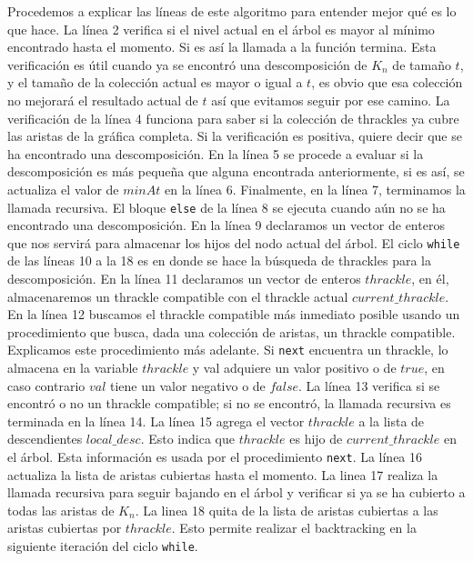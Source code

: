   Procedemos a explicar las líneas de este algoritmo para entender mejor qué es lo que hace. La línea 2
  verifica si el nivel actual en el árbol es mayor al mínimo encontrado hasta el momento. Si es así la
  llamada a la función termina. Esta verificación es útil cuando ya se encontró una descomposición de $K_n$
  de tamaño $t$, y el tamaño de la colección actual es mayor o igual a $t$, es obvio que esa colección no
  mejorará el resultado actual de $t$ así que evitamos seguir por ese camino. La verificación de la línea 4
  funciona para saber si la colección de thrackles ya cubre las aristas de la gráfica completa. Si
  la verificación es positiva, quiere decir que se ha encontrado una descomposición. En la línea 5 se
  procede a evaluar si la descomposición es más pequeña que alguna encontrada anteriormente, si es así, se
  actualiza el valor de $minAt$ en la línea 6. Finalmente, en la línea 7, terminamos la llamada recursiva.
  El bloque \texttt{else} de la línea 8 se ejecuta cuando aún no se ha encontrado una descomposición. En la
  línea 9 declaramos un vector de enteros que nos servirá para almacenar los hijos del nodo actual del
  árbol. El ciclo \texttt{while} de las líneas 10 a la 18 es en donde se hace la búsqueda de thrackles para
  la descomposición. En la línea 11 declaramos un vector de enteros $thrackle$, en él, almacenaremos un
  thrackle compatible con el thrackle actual $current\_thrackle$. En la línea 12 buscamos el thrackle
  compatible más inmediato posible usando un procedimiento que busca, dada una colección de aristas, un
  thrackle compatible. Explicamos este procedimiento más adelante. Si \texttt{next} encuentra un thrackle,
  lo almacena en la variable $thrackle$ y val adquiere un valor positivo o de $true$, en caso contrario
  $val$ tiene un valor negativo o de $false$. La línea 13 verifica si se encontró o no un thrackle
  compatible; si no se encontró, la llamada recursiva es terminada en la línea 14. La línea 15 agrega el
  vector $thrackle$ a la lista de descendientes $local\_desc$. Esto indica que $thrackle$ es hijo de
  $current\_thrackle$ en el árbol. Esta información es usada por el procedimiento \texttt{next}. La línea
  16 actualiza la lista de aristas cubiertas hasta el momento. La linea 17 realiza la llamada recursiva
  para seguir bajando en el árbol y verificar si ya se ha cubierto a todas las aristas de $K_n$. La linea
  18 quita de la lista de aristas cubiertas a las aristas cubiertas por $thrackle$. Esto permite realizar
  el backtracking en la siguiente iteración del ciclo \texttt{while}.

